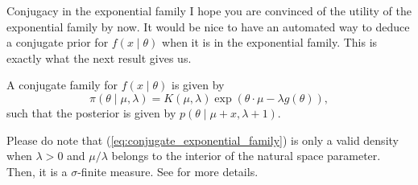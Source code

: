 \begin{frame}{Conjugacy in the exponential family}
I hope you are convinced of the utility of the exponential family by now.
It would be nice to have an automated way to deduce a conjugate prior for $f(x\mid \theta)$ when it is in the exponential family.
This is exactly what the next result gives us.
\begin{remark}
 A conjugate family for $f(x\mid \theta)$ is given by
 \begin{equation}
 \label{eq:conjugate_exponential_family}
  \pi(\theta \mid \mu, \lambda) = K(\mu, \lambda) \exp\left(\theta \cdot \mu - \lambda g(\theta)\right),
 \end{equation}
such that the posterior is given by $p(\theta \mid \mu + x, \lambda + 1)$.
\end{remark}
Please do note that (\ref{eq:conjugate_exponential_family}) is only a valid density when $\lambda > 0$ and $\mu/\lambda$ belongs to the interior of the natural space parameter. 
Then, it is a $\sigma$-finite measure.
See \cite{Diaconis1979} for more details.
\end{frame}


